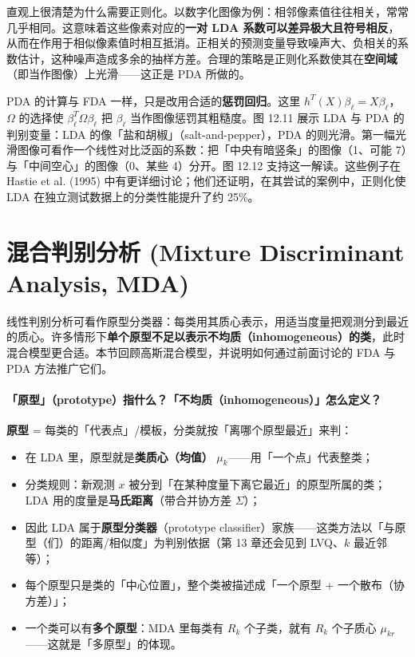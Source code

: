 \begin{remark}
直观上很清楚为什么需要正则化。以数字化图像为例：相邻像素值往往相关，常常几乎相同。这意味着这些像素对应的\textbf{一对 LDA 系数可以差异极大且符号相反}，从而在作用于相似像素值时相互抵消。正相关的预测变量导致噪声大、负相关的系数估计，这种噪声造成多余的抽样方差。合理的策略是正则化系数使其在\textbf{空间域}（即当作图像）上光滑——这正是 PDA 所做的。

PDA 的计算与 FDA 一样，只是改用合适的\textbf{惩罚回归}。这里 $h^T(X)\beta_\ell = X\beta_\ell$，$\Omega$ 的选择使 $\beta_\ell^T \Omega \beta_\ell$ 把 $\beta_\ell$ 当作图像惩罚其粗糙度。图 12.11 展示 LDA 与 PDA 的判别变量：LDA 的像「盐和胡椒」（salt-and-pepper），PDA 的则光滑。第一幅光滑图像可看作一个线性对比泛函的系数：把「中央有暗竖条」的图像（1、可能 7）与「中间空心」的图像（0、某些 4）分开。图 12.12 支持这一解读。这些例子在 Hastie et al. (1995) 中有更详细讨论；他们还证明，在其尝试的案例中，正则化使 LDA 在独立测试数据上的分类性能提升了约 25\%。
\end{remark}

\section{混合判别分析 (Mixture Discriminant Analysis, MDA)}

线性判别分析可看作原型分类器：每类用其质心表示，用适当度量把观测分到最近的质心。许多情形下\textbf{单个原型不足以表示不均质（inhomogeneous）的类}，此时混合模型更合适。本节回顾高斯混合模型，并说明如何通过前面讨论的 FDA 与 PDA 方法推广它们。

\paragraph{「原型」（prototype）指什么？「不均质（inhomogeneous）」怎么定义？}

\textbf{原型} = 每类的「代表点」/模板，分类就按「离哪个原型最近」来判：

\begin{itemize}
\item 在 LDA 里，原型就是\textbf{类质心（均值）} $\mu_k$——用「一个点」代表整类；
\item 分类规则：新观测 $x$ 被分到「在某种度量下离它最近」的原型所属的类；LDA 用的度量是\textbf{马氏距离}（带合并协方差 $\Sigma$）；
\item 因此 LDA 属于\textbf{原型分类器}（prototype classifier）家族——这类方法以「与原型（们）的距离/相似度」为判别依据（第 13 章还会见到 LVQ、$k$ 最近邻等）；
\item 每个原型只是类的「中心位置」，整个类被描述成「一个原型 + 一个散布（协方差）」；
\item 一个类可以有\textbf{多个原型}：MDA 里每类有 $R_k$ 个子类，就有 $R_k$ 个子质心 $\mu_{kr}$——这就是「多原型」的体现。
\end{itemize}

